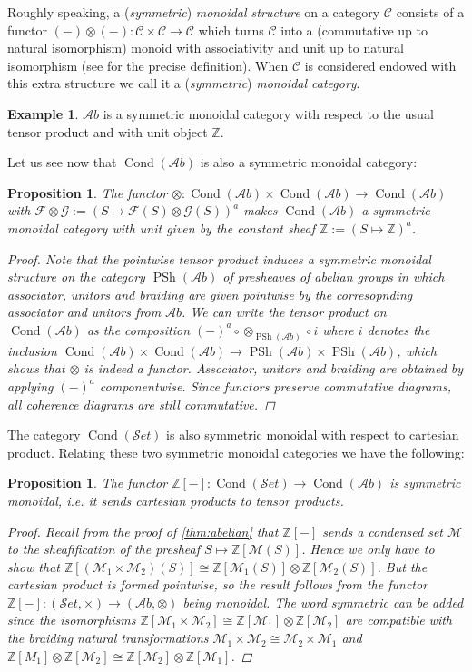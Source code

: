 \documentclass[11pt,A4]{article}
\theoremstyle{plain}
\newtheorem{prop}[thm]{Proposition}
\theoremstyle{definition}
\newtheorem{exa}[thm]{Example}
\theoremstyle{remark}
\newcommand{\Z}{\mathbb{Z}}
\newcommand{\1}{\mathbbm{1}}
\newcommand{\F}{\mathcal{F}}
\newcommand{\G}{\mathcal{G}}
\newcommand{\M}{\mathcal{M}}
\newcommand{\scrC}{\mathscr{C}}
\newcommand{\Ab}{\mathscr{A}b}
\newcommand{\Set}{\mathscr{S}et}
\DeclareMathOperator{\Cond}{Cond}
\DeclareMathOperator{\PSh}{PSh}
\newcommand{\ot}{\otimes}
\begin{document}
Roughly speaking, a (\textit{symmetric}) \textit{monoidal structure} on a category $\scrC$ consists of a functor $(-)\ot(-)\colon \scrC\times \scrC\to \scrC$ which turns $\scrC$ into a (commutative up to natural isomorphism) monoid with associativity and unit up to natural isomorphism (see \cite{nlab:monoidal_category} for the precise definition).
When $\scrC$ is considered endowed with this extra structure we call it a (\textit{symmetric}) \textit{monoidal category}.

\begin{exa}
    $\Ab$ is a symmetric monoidal category with respect to the usual tensor product and with unit object $\Z$.
\end{exa}

Let us see now that $\Cond(\Ab)$ is also a symmetric monoidal category:

\begin{prop}\label{prop:sm}
    The functor $\ot\colon \Cond(\Ab)\times \Cond(\Ab)\to \Cond(\Ab)$ with $\F\ot \G:=(S\mapsto \F(S)\ot \G(S))^{a}$ makes $\Cond(\Ab)$ a symmetric monoidal category with unit given by the constant sheaf $\Z:=(S\mapsto \Z)^{a}$.
	\begin{proof}
	    Note that the pointwise tensor product induces a symmetric monoidal structure on the category $\PSh(\Ab)$ of presheaves of abelian groups in which associator, unitors and braiding are given pointwise by the corresopnding associator and unitors from $\Ab$.
	    We can write the tensor product on $\Cond(\Ab)$ as the composition $(-)^{a}\circ \ot_{\PSh(\Ab)} \circ i$ where $i$ denotes the inclusion $\Cond(\Ab)\times\Cond(\Ab)\to \PSh(\Ab)\times\PSh(\Ab)$, which shows that $\ot$ is indeed a functor.
	    Associator, unitors and braiding are obtained by applying $(-)^{a}$ componentwise.
	    Since functors preserve commutative diagrams, all coherence diagrams are still commutative.
	\end{proof}
\end{prop}

The category $\Cond(\Set)$ is also symmetric monoidal with respect to cartesian product.
Relating these two symmetric monoidal categories we have the following:

\begin{prop}
    The functor $\Z[-]\colon \Cond(\Set)\to \Cond(\Ab)$ is symmetric monoidal, i.e. it sends cartesian products to tensor products.
    \begin{proof}
	Recall from the proof of \cref{thm:abelian} that $\Z[-]$ sends a condensed set $\M$ to the sheafification of the presheaf $S\mapsto \Z[\M(S)]$.
	Hence we only have to show that $\Z[(\M_{1}\times \M_{2})(S)]\cong \Z[\M_{1}(S)]\ot \Z[\M_{2}(S)]$.
	But the cartesian product is formed pointwise, so the result follows from the functor $\Z[-]\colon (\Set,\times )\to (\Ab,\ot)$ being monoidal.
	The word symmetric can be added since the isomorphisms $\Z[\M_{1}\times \M_{2}]\cong \Z[\M_{1}]\ot\Z[\M_{2}]$ are compatible with the braiding natural transformations $\M_{1}\times \M_{2}\cong \M_{2}\times \M_{1}$ and $\Z[M_{1}]\ot \Z[\M_{2}]\cong \Z[\M_{2}]\ot \Z[\M_{1}]$.
    \end{proof}
\end{prop}
\end{document}
